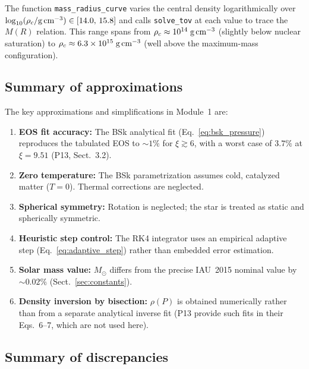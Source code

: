 The function \texttt{mass\_radius\_curve} varies the central density
logarithmically over
$\log_{10}(\rho_{c}/\text{g\,cm}^{-3})\in[14.0,\,15.8]$ and calls
\texttt{solve\_tov} at each value to trace the $M(R)$ relation.
This range spans from $\rho_{c}\approx10^{14}\;\text{g\,cm}^{-3}$
(slightly below nuclear saturation) to
$\rho_{c}\approx6.3\times10^{15}\;\text{g\,cm}^{-3}$
(well above the maximum-mass configuration).

\subsection{Summary of approximations}
\label{sec:approx_summary}

The key approximations and simplifications in Module~1 are:
\begin{enumerate}
  \item \textbf{EOS fit accuracy:} The BSk analytical fit
    (Eq.~\ref{eq:bsk_pressure}) reproduces the tabulated EOS to
    ${\sim}1\%$ for $\xi\gtrsim6$, with a worst case of $3.7\%$ at
    $\xi=9.51$ (P13, Sect.~3.2).
  \item \textbf{Zero temperature:} The BSk parametrization assumes cold,
    catalyzed matter ($T=0$).  Thermal corrections are neglected.
  \item \textbf{Spherical symmetry:} Rotation is neglected; the star is
    treated as static and spherically symmetric.
  \item \textbf{Heuristic step control:} The RK4 integrator uses an
    empirical adaptive step (Eq.~\ref{eq:adaptive_step}) rather than
    embedded error estimation.
  \item \textbf{Solar mass value:} $M_{\odot}$ differs from the precise
    IAU~2015 nominal value by ${\sim}0.02\%$
    (Sect.~\ref{sec:constants}).
  \item \textbf{Density inversion by bisection:} $\rho(P)$ is obtained
    numerically rather than from a separate analytical inverse fit
    (P13 provide such fits in their Eqs.~6--7, which are not used here).
\end{enumerate}

\subsection{Summary of discrepancies}
\label{sec:discrepancies}


